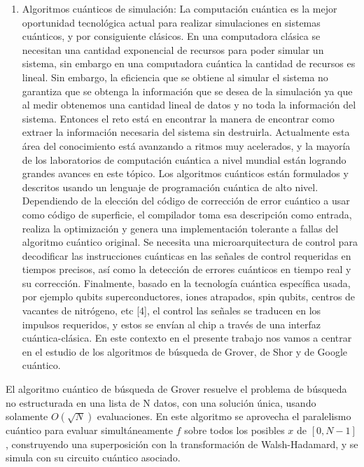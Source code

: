 \begin{enumerate}
    \item Algoritmos cuánticos de simulación: La computación cuántica es la mejor oportunidad tecnológica actual para realizar simulaciones en sistemas cuánticos, y por consiguiente clásicos. En una computadora clásica se necesitan una cantidad exponencial de recursos para poder simular un sistema, sin embargo en una computadora cuántica la cantidad de recursos es lineal. Sin embargo, la eficiencia que se obtiene al simular el sistema no garantiza que se obtenga la información que se desea de la simulación ya que al medir obtenemos una cantidad lineal de datos y no toda la información del sistema. Entonces el reto está en encontrar la manera de encontrar como extraer la información necesaria del sistema sin destruirla. Actualmente esta área del conocimiento está avanzando a ritmos muy acelerados, y la mayoría de los laboratorios de computación cuántica a nivel mundial están logrando grandes avances en este tópico.  Los algoritmos cuánticos están formulados y descritos usando un lenguaje de programación cuántica de alto nivel. Dependiendo de la elección del código de corrección de error cuántico a usar como código de superficie, el compilador toma esa descripción como entrada, realiza la optimización y genera una implementación tolerante a fallas del algoritmo cuántico original. Se necesita una microarquitectura de control para decodificar las instrucciones cuánticas en las señales de control requeridas en tiempos precisos, así como la detección de errores cuánticos en tiempo real y su corrección. Finalmente, basado en la tecnología cuántica específica usada, por ejemplo qubits superconductores, iones atrapados, spin qubits, centros de vacantes de nitrógeno, etc [4], el control las señales se traducen en los impulsos requeridos, y estos se envían al chip a través de una interfaz cuántica-clásica.  En este contexto en el presente trabajo nos vamos a centrar en el estudio de los algoritmos de búsqueda de Grover, de Shor y de Google cuántico.
\end{enumerate}

El algoritmo cuántico de búsqueda de Grover resuelve el problema de búsqueda no estructurada en una lista de N datos, con una solución única, usando solamente $O(\sqrt{N})$ evaluaciones. En este algoritmo se aprovecha el paralelismo cuántico para evaluar simultáneamente $f$ sobre todos los posibles $x$ de $[0,N-1]$, construyendo una superposición con la transformación de Walsh-Hadamard, y se simula con su circuito cuántico asociado.

